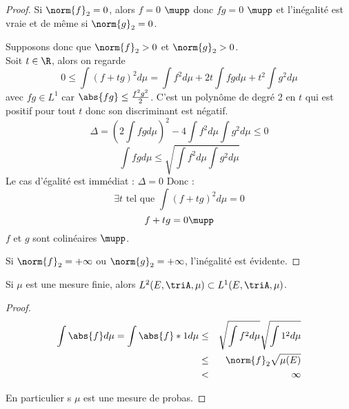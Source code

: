 \begin{proof}
	Si $\norm{f}_2 = 0$, alors $f = 0$ $\mupp$ donc $fg = 0$ $\mupp$ et l'inégalité est vraie et de
	même si $\norm{g}_2 = 0$.

	Supposons donc que $\norm{f}_2 > 0$ et $\norm{g}_2 > 0$.\\
	Soit $t \in \R$, alors on regarde
	$$ 0 \leq \int (f + tg)^2 d \mu = \int f^2 d \mu + 2t \int fg d \mu + t^2 \int g^2 d \mu$$
	avec $fg \in L^1$ car $\abs{fg} \leq \frac{f^2g^2}{2}$.
	C'est un polynôme de degré 2 en $t$ qui est positif pour tout $t$ donc son discriminant est négatif.
	$$  \Delta = (2 \int fg d \mu)^2 - 4 \int f^2 d \mu \int g^2 d \mu \leq 0$$
	$$ \int fg d \mu \leq \sqrt{\int f^2 d \mu \int g^2 d \mu}$$
	Le cas d'égalité est immédiat : $\Delta = 0$ Donc :
	$$\exists t \text { tel que } \int (f + tg)^2 d \mu  = 0$$
	$$ f + tg = 0  \mupp$$
	$f$ et $g$ sont colinéaires $\mupp$.

	Si $\norm{f}_2 = +\infty$ ou $\norm{g}_2 = +\infty$, l'inégalité est évidente.
\end{proof}

\begin{coro}
	Si $\mu$ est une mesure finie, alors $L^2(E, \triA, \mu) \subset L^1(E, \triA, \mu)$.
\end{coro}

\begin{proof}
	\begin{eqnarray*}
		\int \abs{f} d \mu = \int \abs{f}*1 d \mu &\leq& \sqrt{\int f^2 d \mu} \sqrt{\int 1^2 d \mu} \\
		& \leq & \norm{f}_2 \sqrt{\mu(E)} \\
		& < & \infty
	\end{eqnarray*}

	En particulier s $\mu$ est une mesure de probas.
\end{proof}



